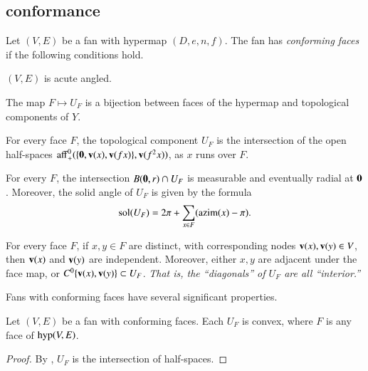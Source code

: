 \subsection{conformance}


\begin{definition}
Let $(V,E)$  be a fan with hypermap $(D,e,n,f)$.    The fan has {\it conforming faces} if the
following conditions hold.
\begin{nomerate}
\item {} $(V,E)$ is acute angled.
\item {} The map $F\mapsto U_F$ is a bijection between faces of the hypermap
and topological components of $Y$.
\item {} For every face $F$, the topological component $U_F$ is the intersection of the open
half-spaces ${\operatorname{aff}}_+^0(\{{\mathbf 0},{\mathbf v}(x),{\mathbf v}({f x})\},{\mathbf v}(f^2 x))$, as $x$ runs
over $F$.
\item {} For every $F$, the intersection $B({\mathbf 0},r)\cap U_F$ is measurable and
eventually radial at ${\mathbf 0}$.  Moreover, the solid angle of $U_F$ is given by the
formula
$$
\operatorname{sol}(U_F) = 2\pi + \sum_{x\in F}({\operatorname{azim}}(x)-\pi).
$$
\item {}  For every face $F$, if $x,y\in F$ are distinct, with corresponding nodes ${\mathbf v}(x),{\mathbf v}(y)\in V$, then
${\mathbf v}(x)$ and ${\mathbf v}(y)$ are independent.
Moreover, 
either $x,y$ are adjacent under the face map, or $C^0\{{\mathbf v}(x),{\mathbf v}(y)\}\subset U_F$.  {\it That is, the ``diagonals'' of $U_F$ are all ``interior.''}
\end{nomerate}
\end{definition}


Fans with conforming faces have several significant properties. 

\begin{lemma}
Let $(V,E)$ be a fan with conforming faces.  
Each $U_F$ is convex, where  $F$ is any face of ${\operatorname{hyp}}(V,E)$.
\end{lemma}
%
%

\begin{proof} By , $U_F$ is the intersection of half-spaces.
\end{proof}

